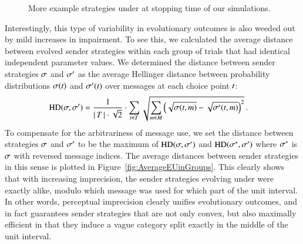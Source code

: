 \begin{figure}
  \caption{More example strategies under \rdd at stopping time of our simulations.}
  \label{fig:MoreExample_strats}
\end{figure}

Interestingly, this type of variability in evolutionary outcomes is
also weeded out by mild increases in impairment. To see this, we
calculated the average distance between evolved sender strategies
within each group of trials that had identical independent
parameter values. We determined the distance between sender strategies
$\sigma$ and $\sigma'$ as the average Hellinger distance between
probability distributions $\sigma(t)$ and $\sigma'(t)$
over messages at each choice point $t$:
\begin{align*}
  \text{HD}(\sigma,\sigma') & = \frac{1}{{\left \lvert \, T \, \right\rvert \cdot
     \sqrt{2}}} \cdot  \sum_{t \in T} 
 \sqrt{\sum_{m \in  M}
         \left ( \sqrt{\sigma(t,m)} -
         \sqrt{\sigma'(t,m)} \right )^2 }\,.
\end{align*}
To compensate for the arbitrariness of message use, we set the
distance between strategies $\sigma$ and $\sigma'$ to be the maximum
of $\text{HD}(\sigma,\sigma')$ and $\text{HD}(\sigma^*,\sigma')$
where $\sigma^*$ is $\sigma$ with reversed message indices. The
average distances between sender strategies in this sense is plotted
in Figure~\ref{fig:AverageEUinGroups}. This clearly shows that with
increasing imprecision, the sender strategies evolving under \rdd were
exactly alike, modulo which message was used for which part of the
unit interval. In other words, perceptual imprecision clearly unifies
evolutionary outcomes, and in fact guarantees sender strategies that
are not only convex, but also maximally efficient in that they induce
a vague category split exactly in the middle of the unit interval.


